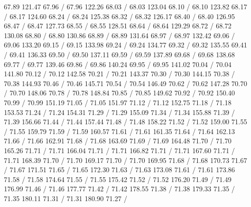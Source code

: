 { 67.89 121.47 67.96 /
 67.96 122.26 68.03 /
 68.03 123.04 68.10 /
 68.10 123.82 68.17 /
 68.17 124.60 68.24 /
 68.24 125.38 68.32 /
 68.32 126.17 68.40 /
 68.40 126.95 68.47 /
 68.47 127.73 68.55 /
 68.55 128.51 68.64 /
 68.64 129.29 68.72 /
 68.72 130.08 68.80 /
 68.80 130.86 68.89 /
 68.89 131.64 68.97 /
 68.97 132.42 69.06 /
 69.06 133.20 69.15 /
 69.15 133.98 69.24 /
 69.24 134.77 69.32 /
 69.32 135.55 69.41 /
 69.41 136.33 69.50 /
 69.50 137.11 69.59 /
 69.59 137.89 69.68 /
 69.68 138.68 69.77 /
 69.77 139.46 69.86 /
 69.86 140.24 69.95 /
 69.95 141.02 70.04 /
 70.04 141.80 70.12 /
 70.12 142.58 70.21 /
 70.21 143.37 70.30 /
 70.30 144.15 70.38 /
 70.38 144.93 70.46 /
 70.46 145.71 70.54 /
 70.54 146.49 70.62 /
 70.62 147.28 70.70 /
 70.70 148.06 70.78 /
 70.78 148.84 70.85 /
 70.85 149.62 70.92 /
 70.92 150.40 70.99 /
 70.99 151.19 71.05 /
 71.05 151.97 71.12 /
 71.12 152.75 71.18 /
 71.18 153.53 71.24 /
 71.24 154.31 71.29 /
 71.29 155.09 71.34 /
 71.34 155.88 71.39 /
 71.39 156.66 71.44 /
 71.44 157.44 71.48 /
 71.48 158.22 71.52 /
 71.52 159.00 71.55 /
 71.55 159.79 71.59 /
 71.59 160.57 71.61 /
 71.61 161.35 71.64 /
 71.64 162.13 71.66 /
 71.66 162.91 71.68 /
 71.68 163.69 71.69 /
 71.69 164.48 71.70 /
 71.70 165.26 71.71 /
 71.71 166.04 71.71 /
 71.71 166.82 71.71 /
 71.71 167.60 71.71 /
 71.71 168.39 71.70 /
 71.70 169.17 71.70 /
 71.70 169.95 71.68 /
 71.68 170.73 71.67 /
 71.67 171.51 71.65 /
 71.65 172.30 71.63 /
 71.63 173.08 71.61 /
 71.61 173.86 71.58 /
 71.58 174.64 71.55 /
 71.55 175.42 71.52 /
 71.52 176.20 71.49 /
 71.49 176.99 71.46 /
 71.46 177.77 71.42 /
 71.42 178.55 71.38 /
 71.38 179.33 71.35 /
 71.35 180.11 71.31 /
 71.31 180.90 71.27 /
}
